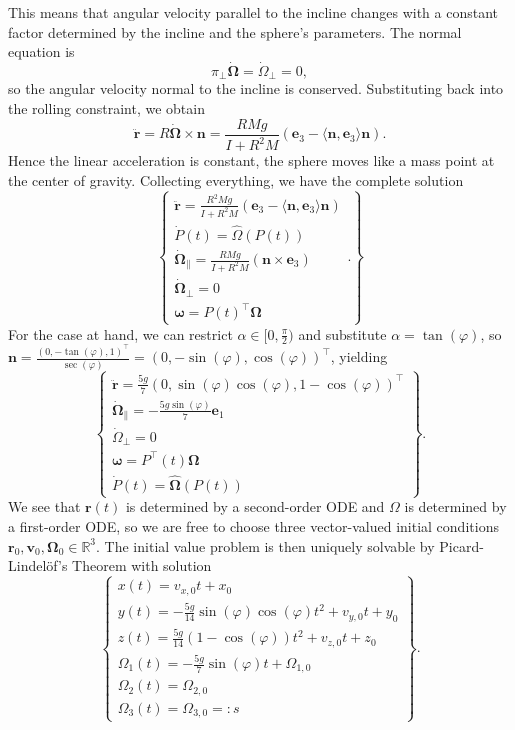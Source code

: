 This means that angular velocity parallel to the incline changes with a constant factor determined by the incline and the sphere's parameters. The normal equation is \[
    \pi_\perp \dot{\bm{\Omega}}=\dot{\Omega}_\perp = 0
,\] so the angular velocity normal to the incline is conserved. Substituting back into the rolling constraint, we obtain \[
\ddot{\bm{r}}=R\dot{\bm{\Omega}} \times \bm{n} = \frac{RMg}{I+R^2M} (\bm{e}_3-\langle \bm{n}, \bm{e}_3 \rangle \bm{n} )
.\] Hence the linear acceleration is constant, the sphere moves like a mass point at the center of gravity. Collecting everything, we have the complete solution
\begin{equation}
    \left.\begin{cases}
            \ddot{\bm{r}} = \frac{R^2 Mg}{I+R^2M}(\bm{e}_3 - \langle \bm{n},\bm{e}_3  \rangle \bm{n} )\\
    \dot{P}(t)= \widehat{\Omega}(P(t))\\
    \dot{\bm{\Omega}}_\| = \frac{RMg}{I+R^2M}(\bm{n} \times \bm{e}_3) \\
    \dot{\bm{\Omega}}_\perp = 0\\
    \bm{\omega} = P(t)^\top\bm{\Omega}
    \end{cases}. 
\right\}
\end{equation}
For the case at hand, we can restrict $\alpha \in [0,\frac{\pi}{2})$ and substitute $\alpha = \tan(\varphi)$, so $\bm{n}=\frac{(0,-\tan(\varphi),1)^\top}{\sec(\varphi)}=(0, -\sin(\varphi), \cos(\varphi))^\top$, yielding
\begin{equation*}
    \left.\begin{cases}
            \ddot{\bm{r}} = \frac{5g}{7}(0, \sin (\varphi) \cos (\varphi), 1-\cos(\varphi))^\top\\
        \dot{\bm{\Omega}}_\| = -\frac{5g\sin(\varphi)}{7}\bm{e}_1 \\
    \dot{\Omega}_\perp = 0\\
    \bm{\omega} = P^\top(t)\bm{\Omega}\\
    \dot{P}(t)= \widehat{\bm{\Omega}}(P(t))
    \end{cases} 
\right\}.
\end{equation*}
We see that $\bm{r}(t)$ is determined by a second-order ODE and $\Omega$ is determined by a first-order ODE, so we are free to choose three vector-valued initial conditions $\bm{r}_0, \bm{v}_0, \bm{\Omega}_0 \in \mathbb{R}^3$. The initial value problem is then uniquely solvable by Picard-Lindelöf's Theorem with solution 
\begin{equation}
    \left.\begin{cases}
            x(t)=v_{x,0}t+x_0\\
            y(t)=-\frac{5g}{14}\sin(\varphi)\cos(\varphi)t^2+v_{y,0}t+y_0\\
            z(t)=\frac{5g}{14}(1-\cos(\varphi))t^2+v_{z,0}t+z_0\\
            \Omega_1(t)=- \frac{5g}{7}\sin(\varphi)t + \Omega_{1,0}\\
            \Omega_2(t)= \Omega_{2,0}\\
            \Omega_3(t)=\Omega_{3,0}=:s
    \end{cases} 
\right\}.
\end{equation}
